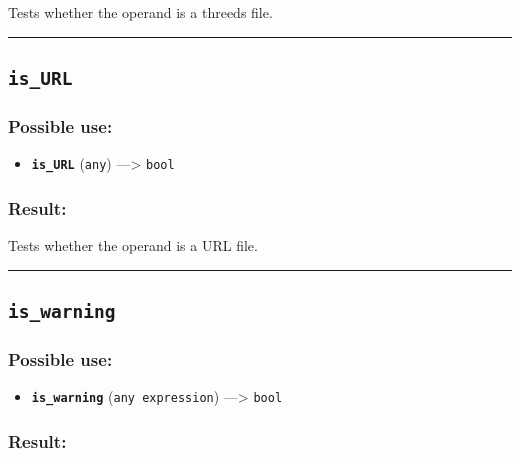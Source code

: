 \documentclass[]{book}
\providecommand{\tightlist}{%
  \setlength{\itemsep}{0pt}\setlength{\parskip}{0pt}}
\theoremstyle{definition}
\theoremstyle{definition}
\theoremstyle{definition}
\theoremstyle{remark}
\begin{document}
Tests whether the operand is a threeds file.

\begin{center}\rule{0.5\linewidth}{\linethickness}\end{center}

\subsection{\texorpdfstring{\texttt{is\_URL}}{is\_URL}}\label{is_url}

\subsubsection{Possible use:}\label{possible-use-307}

\begin{itemize}
\tightlist
\item
  \textbf{\texttt{is\_URL}} (\texttt{any}) ---\textgreater{}
  \texttt{bool}
\end{itemize}

\subsubsection{Result:}\label{result-297}

Tests whether the operand is a URL file.

\begin{center}\rule{0.5\linewidth}{\linethickness}\end{center}

\subsection{\texorpdfstring{\texttt{is\_warning}}{is\_warning}}\label{is_warning}

\subsubsection{Possible use:}\label{possible-use-308}

\begin{itemize}
\tightlist
\item
  \textbf{\texttt{is\_warning}} (\texttt{any\ expression})
  ---\textgreater{} \texttt{bool}
\end{itemize}

\subsubsection{Result:}\label{result-298}
\end{document}
